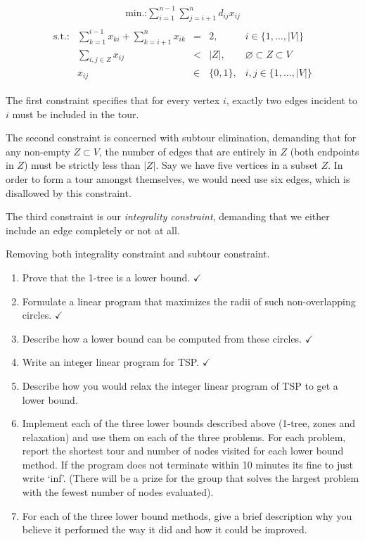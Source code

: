 \documentclass{article}
\begin{document}
\begin{align*}
  \text{min.:} \sum_{i=1}^{n-1}\sum_{j=i+1}^{n} d_{ij}x_{ij}
\end{align*}
\begin{align*}
  \begin{array}{lrcll}
    \text{s.t.:} & \displaystyle\sum_{k=1}^{i-1}x_{ki} + \displaystyle\sum_{k=i+1}^{n} x_{ik} &= &2, & i\in \{1,\dots,|V|\}\\
                 & \displaystyle\sum_{i,j\in Z} x_{ij} &< &|Z|, & \varnothing \subset Z \subset V\\
                 & x_{ij} &\in & \{0,1\}, & i,j \in \{1,\dots,|V|\}
  \end{array}
\end{align*}

The first constraint specifies that for every vertex $i$, exactly two
edges incident to $i$ must be included in the tour.

The second constraint is concerned with subtour elimination, demanding
that for any non-empty $Z\subset V$, the number of edges that are
entirely in $Z$ (both endpoints in $Z$) must be strictly less than
$|Z|$. Say we have five vertices in a subset $Z$. In order to form a
tour amongst themselves, we would need use six edges, which is
disallowed by this constraint.

The third constraint is our \emph{integrality constraint}, demanding
that we either include an edge completely or not at all.

Removing both integrality constraint and subtour constraint.

\newpage
\begin{enumerate}
  \item Prove that the 1-tree is a lower bound. $\checkmark$
  \item Formulate a linear program that maximizes the radii of such
    non-overlapping circles. $\checkmark$
  \item Describe how a lower bound can be computed from these circles. $\checkmark$
  \item Write an integer linear program for TSP. $\checkmark$
  \item Describe how you would relax the integer linear program of TSP to get a lower bound.
  \item Implement each of the three lower bounds described above (1-tree, zones and relaxation) and use them on each of the three problems. For each problem, report the shortest tour and number of nodes visited for each lower bound method. If the program does not terminate within 10 minutes its fine to just write ‘inf’. (There will be a prize for the group that solves the largest problem with the fewest number of nodes evaluated).
  \item For each of the three lower bound methods, give a brief description why you believe it performed the way it did and how it could be improved. 
\end{enumerate}
\end{document}
